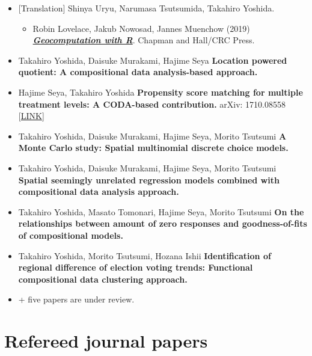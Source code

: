 \documentclass[
]{book}
\providecommand{\tightlist}{%
  \setlength{\itemsep}{0pt}\setlength{\parskip}{0pt}}
\begin{document}
\begin{itemize}
\tightlist
\item
  {[}Translation{]} Shinya Uryu, Narumasa Tsutsumida, Takahiro Yoshida.

  \begin{itemize}
  \tightlist
  \item
    Robin Lovelace, Jakub Nowosad, Jannes Muenchow (2019)
    \textbf{\emph{\href{https://geocompr.robinlovelace.net/}{Geocomputation with R}}}. Chapman and Hall/CRC Press.
  \end{itemize}
\item
  Takahiro Yoshida, Daisuke Murakami, Hajime Seya
  \textbf{Location powered quotient: A compositional data analysis-based approach.}
\item
  Hajime Seya, Takahiro Yoshida
  \textbf{Propensity score matching for multiple treatment levels: A CODA-based contribution.}
  arXiv: 1710.08558 {[}\href{https://arxiv.org/abs/1710.08558}{LINK}{]}
\item
  Takahiro Yoshida, Daisuke Murakami, Hajime Seya, Morito Tsutsumi
  \textbf{A Monte Carlo study: Spatial multinomial discrete choice models.}
\item
  Takahiro Yoshida, Daisuke Murakami, Hajime Seya, Morito Tsutsumi
  \textbf{Spatial seemingly unrelated regression models combined with compositional data analysis approach.}
\item
  Takahiro Yoshida, Masato Tomonari, Hajime Seya, Morito Tsutsumi
  \textbf{On the relationships between amount of zero responses and goodness-of-fits of compositional models.}
\item
  Takahiro Yoshida, Morito Tsutsumi, Hozana Ishii
  \textbf{Identification of regional difference of election voting trends: Functional compositional data clustering approach.}
\item
  + five papers are under review.
\end{itemize}

\section*{Refereed journal papers}\label{refereed-journal-papers}
\end{document}
